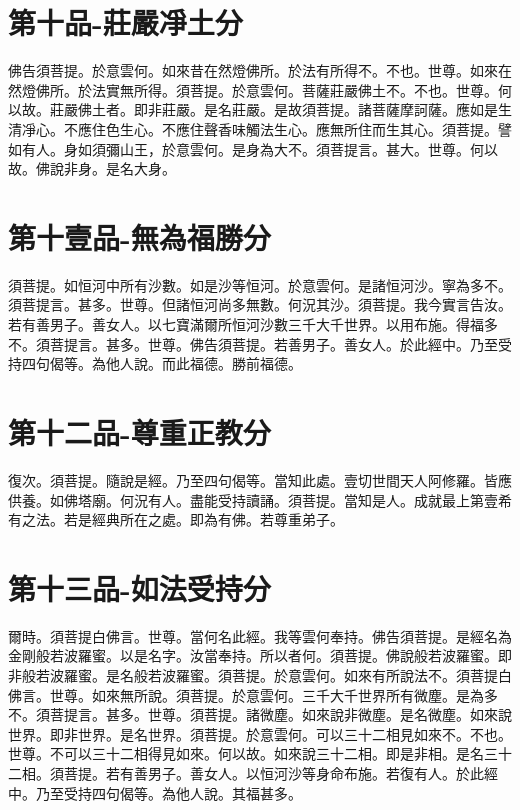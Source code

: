 \documentclass[a6paper, 22pt, twocolumn]{cvertbook}
\begin{document}
\chapter{第十品-莊嚴凈土分}
\large 佛告須菩提。於意雲何。如來昔在然燈佛所。於法有所得不。不也。世尊。如來在然燈佛所。於法實無所得。須菩提。於意雲何。菩薩莊嚴佛土不。不也。世尊。何以故。莊嚴佛土者。即非莊嚴。是名莊嚴。是故須菩提。諸菩薩摩訶薩。應如是生清凈心。不應住色生心。不應住聲香味觸法生心。應無所住而生其心。須菩提。譬如有人。身如須彌山王，於意雲何。是身為大不。須菩提言。甚大。世尊。何以故。佛說非身。是名大身。

\chapter{第十壹品-無為福勝分}
\large 須菩提。如恒河中所有沙數。如是沙等恒河。於意雲何。是諸恒河沙。寧為多不。須菩提言。甚多。世尊。但諸恒河尚多無數。何況其沙。須菩提。我今實言告汝。若有善男子。善女人。以七寶滿爾所恒河沙數三千大千世界。以用布施。得福多不。須菩提言。甚多。世尊。佛告須菩提。若善男子。善女人。於此經中。乃至受持四句偈等。為他人說。而此福德。勝前福德。
\chapter{第十二品-尊重正教分}
\large 復次。須菩提。隨說是經。乃至四句偈等。當知此處。壹切世間天人阿修羅。皆應供養。如佛塔廟。何況有人。盡能受持讀誦。須菩提。當知是人。成就最上第壹希有之法。若是經典所在之處。即為有佛。若尊重弟子。
\chapter{第十三品-如法受持分}
\large 爾時。須菩提白佛言。世尊。當何名此經。我等雲何奉持。佛告須菩提。是經名為金剛般若波羅蜜。以是名字。汝當奉持。所以者何。須菩提。佛說般若波羅蜜。即非般若波羅蜜。是名般若波羅蜜。須菩提。於意雲何。如來有所說法不。須菩提白佛言。世尊。如來無所說。須菩提。於意雲何。三千大千世界所有微塵。是為多不。須菩提言。甚多。世尊。須菩提。諸微塵。如來說非微塵。是名微塵。如來說世界。即非世界。是名世界。須菩提。於意雲何。可以三十二相見如來不。不也。世尊。不可以三十二相得見如來。何以故。如來說三十二相。即是非相。是名三十二相。須菩提。若有善男子。善女人。以恒河沙等身命布施。若復有人。於此經中。乃至受持四句偈等。為他人說。其福甚多。
\end{document}
